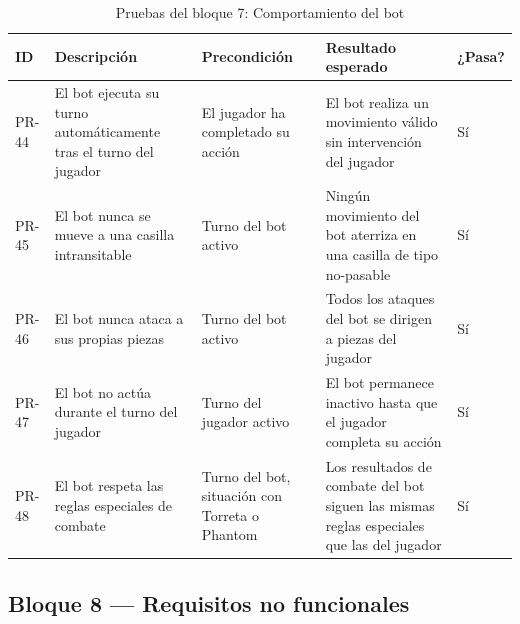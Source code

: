 \begin{table}[H]
	\centering
	\small
	\begin{tabular}{|>{\centering\arraybackslash}p{1cm}|>{\centering\arraybackslash}p{4cm}|>{\centering\arraybackslash}p{4cm}|>{\centering\arraybackslash}p{4cm}|>{\centering\arraybackslash}p{1.5cm}|}
		\hline
		\textbf{ID} & \textbf{Descripción} & \textbf{Precondición} & \textbf{Resultado esperado} & \textbf{¿Pasa?} \\
		\hline
		PR-44 & El bot ejecuta su turno automáticamente tras el turno del jugador & El jugador ha completado su acción & El bot realiza un movimiento válido sin intervención del jugador & \cellcolor{green!40}Sí \\
		\hline
		PR-45 & El bot nunca se mueve a una casilla intransitable & Turno del bot activo & Ningún movimiento del bot aterriza en una casilla de tipo no-pasable & \cellcolor{green!40}Sí \\
		\hline
		PR-46 & El bot nunca ataca a sus propias piezas & Turno del bot activo & Todos los ataques del bot se dirigen a piezas del jugador & \cellcolor{green!40}Sí \\
		\hline
		PR-47 & El bot no actúa durante el turno del jugador & Turno del jugador activo & El bot permanece inactivo hasta que el jugador completa su acción & \cellcolor{green!40}Sí \\
		\hline
		PR-48 & El bot respeta las reglas especiales de combate & Turno del bot, situación con Torreta o Phantom & Los resultados de combate del bot siguen las mismas reglas especiales que las del jugador & \cellcolor{green!40}Sí \\
		\hline
	\end{tabular}
	\caption{Pruebas del bloque 7: Comportamiento del bot}
\end{table}

\clearpage

\subsection{Bloque 8 — Requisitos no funcionales}

